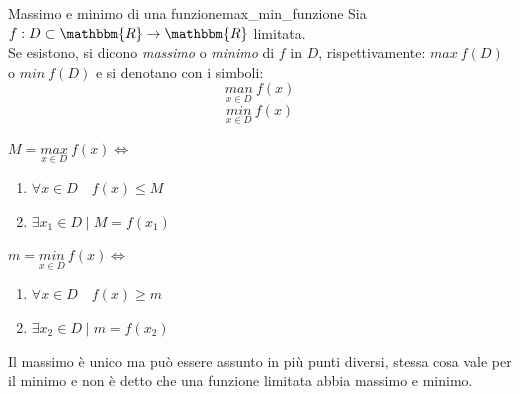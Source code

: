 \documentclass[12pt]{report}
\newcounter{definition}
\begin{document}
	\begin{definition}{Massimo e minimo di una funzione}{max_min_funzione}
		Sia $f: D \subset \mathbbm{R} \to \mathbbm{R}$ limitata. \\
		Se esistono, si dicono \textit{massimo} o \textit{minimo} di $f$ in $D$, rispettivamente: $max\ f(D)$ o $min\ f(D)$ e si denotano con i simboli:
		\[
		\underset{x \in D}{man}\ f(x)
		\]
		\[
		\underset{x \in D}{min}\ f(x)
		\]
	\end{definition}
	\begin{note}{}{}
		$M= \underset{x \in D}{max}\ f(x) \iff $
		\begin{enumerate}
			\item $\forall x \in D \quad f(x) \leq M$
			\item $\exists x_1 \in D \mid M = f(x_1)$
		\end{enumerate}
		$m = \underset{x \in D}{min}\ f(x) \iff$
		\begin{enumerate}
			\item $\forall x \in D \quad f(x) \geq m$
			\item $\exists x_2 \in D \mid m=f(x_2)$
		\end{enumerate}
		Il massimo è unico ma può essere assunto in più punti diversi, stessa cosa vale per il minimo e non è detto che una funzione limitata abbia massimo e minimo.
	\end{note}
\end{document}
